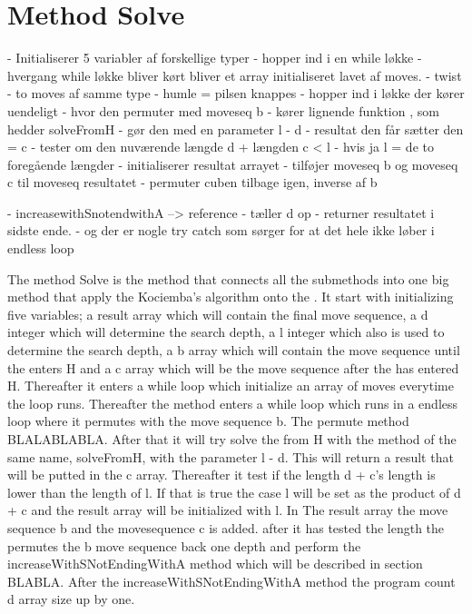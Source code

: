 \section{Method Solve}

- Initialiserer 5 variabler af forskellige typer
- hopper ind i en while l\o{}kke
- hvergang while l\o{}kke bliver k\o{}rt bliver et array initialiseret lavet af moves.
- twist
- to moves af samme type
-  humle = pilsen knappes
- hopper ind i l\o{}kke der k\o{}rer uendeligt
- hvor den permuter med moveseq b
- k\o{}rer lignende funktion , som hedder solveFromH
- g\o{}r den med en parameter l - d
- resultat den f\aa{}r s\ae{}tter den = c
- tester om den nuv\ae{}rende l\ae{}ngde d + l\ae{}ngden c < l
- hvis ja l = de to foreg\aa{}ende l\ae{}ngder
- initialiserer resultat arrayet
- tilf\o{}jer moveseq b og moveseq c til moveseq resultatet
- permuter cuben tilbage igen, inverse af b

- increasewithSnotendwithA --> reference
- t\ae{}ller d op
- returner resultatet i sidste ende.
-  og der er nogle try catch som s\o{}rger for at det hele ikke l\o{}ber i endless loop

The method Solve is the method that connects all the submethods into one big method that apply the Kociemba's algorithm onto the \rubik{}. It start with initializing five variables; a result array which will contain the final move sequence, a d integer which will determine the search depth, a l integer which also is used to determine the search depth, a b array which will contain the move sequence until the \rubik{} enters H and a c array which will be the move sequence after the \rubik{} has entered H. Thereafter it enters a while loop which initialize an array of moves everytime the loop runs. Thereafter the method enters a while loop which runs in a endless loop where it permutes with the move sequence b. The permute method BLALABLABLA. After that it will try solve the \rubik{} from H with the method of the same name, solveFromH, with the parameter l - d.  This will return a result that will be putted in the c array. Thereafter it test if the length d + c's length is lower than the length of l. If that is true the case l will be set as the product of d + c and the result array will be initialized with l. In The result array the move sequence b and the movesequence c is added. after it has tested the length the \rubik{}  permutes the b move sequence back one depth and perform the increaseWithSNotEndingWithA method which will be described in section BLABLA. After the increaseWithSNotEndingWithA method the program count d array size up by one.


